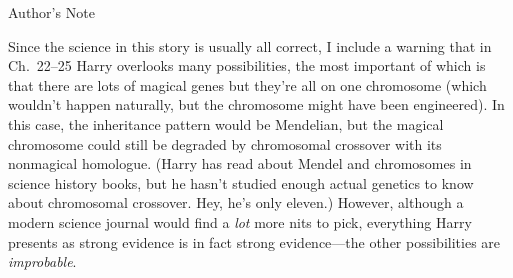 


\frontmatter
\newcommand{\hpBookNo}{2}
\newcommand{\hpBookChar}{Harry James Potter-Evans-Verres}
\newcommand{\hpBookTitle}{Professor's Games}


\clearpage
\thispagestyle{empty}

\mainmatter
\setcounter{chapter}{21}



\clearpage
\thispagestyle{empty}
{
\vspace*{6\baselineskip}
\itshape
\begin{center}
Author's Note
\end{center}

Since the science in this story is usually all correct, I include a warning
that in Ch.~22--25 Harry overlooks many possibilities, the most important of
which is that there are lots of magical genes but they're all on one chromosome
(which wouldn't happen naturally, but the chromosome might have been
engineered). In this case, the inheritance pattern would be Mendelian, but the
magical chromosome could still be degraded by chromosomal crossover with its
nonmagical homologue. (Harry has read about Mendel and chromosomes in science
history books, but he hasn't studied enough actual genetics to know about
chromosomal crossover. Hey, he's only eleven.) However, although a modern
science journal would find a \emph{lot} more nits to pick, everything Harry
presents as strong evidence is in fact strong evidence---the other
possibilities are \emph{improbable}.
}

 














